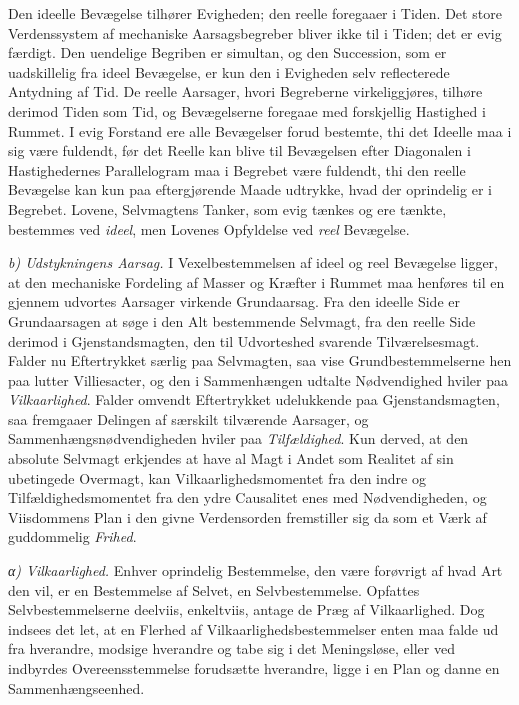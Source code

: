 \documentclass[12pt,a4paper]{book}
\newcommand{\runin}[1]{\emph{#1}\hspace{0.4em}}
\newcommand{\subrunin}[1]{\emph{#1}\hspace{0.4em}}
\begin{document}
Den ideelle Bevægelse tilhører Evigheden; den reelle foregaaer i Tiden.
Det store Verdenssystem af mechaniske Aarsagsbegreber bliver ikke til i
Tiden; det er evig færdigt. Den uendelige Begriben er simultan, og den
Succession, som er uadskillelig fra ideel Bevægelse, er kun den i
Evigheden selv reflecterede Antydning af Tid. De reelle Aarsager, hvori
Begreberne virkeliggjøres, tilhøre derimod Tiden som Tid, og
Bevægelserne foregaae med forskjellig Hastighed i Rummet. I evig
Forstand ere alle Bevægelser forud bestemte, thi det Ideelle maa i sig
være fuldendt, før det Reelle kan blive til
Bevægelsen efter Diagonalen i Hastighedernes Parallelogram maa i
Begrebet være fuldendt, thi den reelle Bevægelse kan kun paa
eftergjørende Maade udtrykke, hvad der oprindelig er i Begrebet.
Lovene, Selvmagtens Tanker, som evig tænkes og ere tænkte, bestemmes
ved \emph{ideel}, men Lovenes Opfyldelse ved \emph{reel} Bevægelse.

\runin{b) Udstykningens Aarsag.} I Vexelbestemmelsen af
ideel og reel Bevægelse ligger, at den mechaniske Fordeling af Masser
og Kræfter i Rummet maa henføres til en gjennem udvortes Aarsager
virkende Grundaarsag. Fra den ideelle Side er Grundaarsagen at søge i
den Alt bestemmende Selvmagt, fra den reelle Side derimod i
Gjenstandsmagten, den til Udvorteshed svarende Tilværelsesmagt. Falder
nu Eftertrykket særlig paa Selvmagten, saa vise Grundbestemmelserne hen
paa lutter Villiesacter, og den i Sammenhængen udtalte Nødvendighed
hviler paa \emph{Vilkaarlighed}. Falder omvendt Eftertrykket
udelukkende paa Gjenstandsmagten, saa fremgaaer Delingen af særskilt
tilværende Aarsager, og Sammenhængsnødvendigheden hviler paa
\emph{Tilfældighed}. Kun derved, at den absolute Selvmagt erkjendes at
have al Magt i Andet som Realitet af sin ubetingede Overmagt, kan
Vilkaarlighedsmomentet fra den indre og Tilfældighedsmomentet fra den
ydre Causalitet enes med Nødvendigheden, og Viisdommens Plan i den
givne Verdensorden fremstiller sig da som et Værk af guddommelig
\emph{Frihed}.

\subrunin{α) Vilkaarlighed.} Enhver oprindelig Bestemmelse, den være
forøvrigt af hvad Art den vil, er en Bestemmelse af Selvet, en
Selvbestemmelse. Opfattes Selvbestemmelserne deelviis, enkeltviis,
antage de Præg af Vilkaarlighed. Dog indsees det let, at en Flerhed af
Vilkaarlighedsbestemmelser enten maa falde ud fra hverandre, modsige
hverandre og tabe sig i det Meningsløse, eller ved indbyrdes
Overeensstemmelse forudsætte hverandre, ligge i en Plan og danne en
Sammenhængseenhed.
\end{document}
